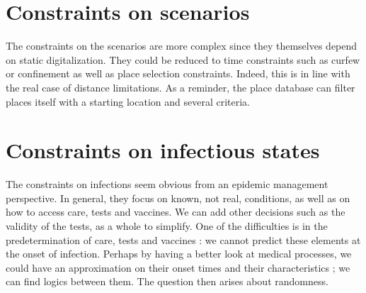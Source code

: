 \section{Constraints on scenarios}

The constraints on the scenarios are more complex since they themselves depend on static digitalization. They could be reduced to time constraints such as curfew or confinement as well as place selection constraints. Indeed, this is in line with the real case of distance limitations. As a reminder, the place database can filter places itself with a starting location and several criteria.

\section{Constraints on infectious states}

The constraints on infections seem obvious from an epidemic management perspective. In general, they focus on known, not real, conditions, as well as on how to access care, tests and vaccines. We can add other decisions such as the validity of the tests, as a whole to simplify. One of the difficulties is in the predetermination of care, tests and vaccines : we cannot predict these elements at the onset of infection. Perhaps by having a better look at medical processes, we could have an approximation on their onset times and their characteristics ; we can find logics between them. The question then arises about randomness.